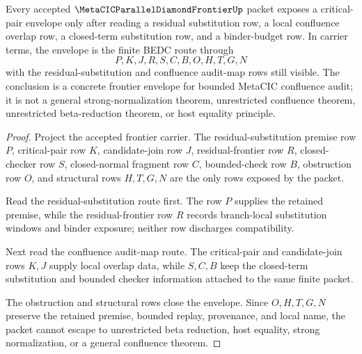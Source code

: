 \begin{theorem}
\label{thm:metacic-parallel-diamond-critical-pair-envelope}
Every accepted $\MetaCICParallelDiamondFrontierUp$ packet exposes a critical-pair envelope only after reading a residual substitution row, a local confluence overlap row, a closed-term substitution row, and a binder-budget row. In carrier terms, the envelope is the finite BEDC route through
$$
P,K,J,R,S,C,B,O,H,T,G,N
$$
with the residual-substitution and confluence audit-map rows still visible. The conclusion is a concrete frontier envelope for bounded MetaCIC confluence audit; it is not a general strong-normalization theorem, unrestricted confluence theorem, unrestricted beta-reduction theorem, or host equality principle.
\end{theorem}
\begin{proof}
Project the accepted frontier carrier. The residual-substitution premise row $P$, critical-pair row $K$, candidate-join row $J$, residual-frontier row $R$, closed-checker row $S$, closed-normal fragment row $C$, bounded-check row $B$, obstruction row $O$, and structural rows $H,T,G,N$ are the only rows exposed by the packet.

Read the residual-substitution route first. The row $P$ supplies the retained premise, while the residual-frontier row $R$ records branch-local substitution windows and binder exposure; neither row discharges compatibility.

Next read the confluence audit-map route. The critical-pair and candidate-join rows $K,J$ supply local overlap data, while $S,C,B$ keep the closed-term substitution and bounded checker information attached to the same finite packet.

The obstruction and structural rows close the envelope. Since $O,H,T,G,N$ preserve the retained premise, bounded replay, provenance, and local name, the packet cannot escape to unrestricted beta reduction, host equality, strong normalization, or a general confluence theorem.
\end{proof}

